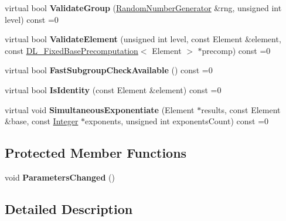 \begin{DoxyCompactItemize}
\item 
\hypertarget{class_d_l___group_parameters_a36b134bd5e45f2f5399adeaab93cfdcf}{
virtual bool {\bfseries ValidateGroup} (\hyperlink{class_random_number_generator}{RandomNumberGenerator} \&rng, unsigned int level) const =0}
\label{class_d_l___group_parameters_a36b134bd5e45f2f5399adeaab93cfdcf}

\item 
\hypertarget{class_d_l___group_parameters_a1e6cc62adbecdd858be49f6f4db15f50}{
virtual bool {\bfseries ValidateElement} (unsigned int level, const Element \&element, const \hyperlink{class_d_l___fixed_base_precomputation}{DL\_\-FixedBasePrecomputation}$<$ Element $>$ $\ast$precomp) const =0}
\label{class_d_l___group_parameters_a1e6cc62adbecdd858be49f6f4db15f50}

\item 
\hypertarget{class_d_l___group_parameters_a462833fb813706933eb9136258f17d40}{
virtual bool {\bfseries FastSubgroupCheckAvailable} () const =0}
\label{class_d_l___group_parameters_a462833fb813706933eb9136258f17d40}

\item 
\hypertarget{class_d_l___group_parameters_afb67ae388bba22447e45a74f87b2630b}{
virtual bool {\bfseries IsIdentity} (const Element \&element) const =0}
\label{class_d_l___group_parameters_afb67ae388bba22447e45a74f87b2630b}

\item 
\hypertarget{class_d_l___group_parameters_ac11607926a66ce8ba8ae273a5b0464e7}{
virtual void {\bfseries SimultaneousExponentiate} (Element $\ast$results, const Element \&base, const \hyperlink{class_integer}{Integer} $\ast$exponents, unsigned int exponentsCount) const =0}
\label{class_d_l___group_parameters_ac11607926a66ce8ba8ae273a5b0464e7}

\end{DoxyCompactItemize}
\subsection*{Protected Member Functions}
\begin{DoxyCompactItemize}
\item 
\hypertarget{class_d_l___group_parameters_a062c4508c8179ca10a7c1553ca031978}{
void {\bfseries ParametersChanged} ()}
\label{class_d_l___group_parameters_a062c4508c8179ca10a7c1553ca031978}

\end{DoxyCompactItemize}


\subsection{Detailed Description}
